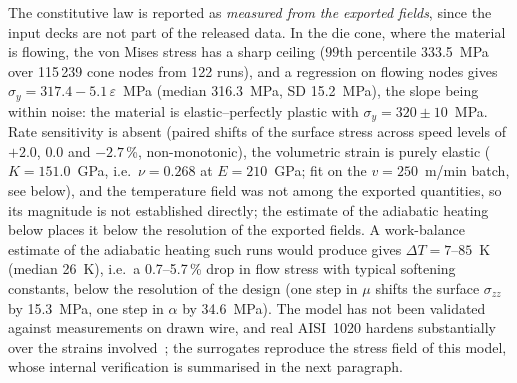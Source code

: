 The constitutive law is reported as \emph{measured from the exported fields}, since the input decks are not part of the released data. In the die cone, where the material is flowing, the von Mises stress has a sharp ceiling (99th percentile 333.5~MPa over 115\,239 cone nodes from 122 runs), %
and a regression on flowing nodes gives $\sigma_y = 317.4 - 5.1\,\varepsilon$~MPa (median 316.3~MPa, SD 15.2~MPa), the slope being within noise: %
the material is elastic--perfectly plastic with $\sigma_y = 320 \pm 10$~MPa. %
Rate sensitivity is absent (paired shifts of the surface stress across speed levels of $+2.0$, $0.0$ and $-2.7$\,\%, non-monotonic), %
the volumetric strain is purely elastic ($K = 151.0$~GPa, i.e.\ $\nu = 0.268$ at $E = 210$~GPa; fit on the $v = 250$~m/min batch, see below), and the temperature field was not among the exported quantities, so its magnitude is not established directly; the estimate of the adiabatic heating below places it below the resolution of the exported fields. %
A work-balance estimate of the adiabatic heating such runs would produce gives $\Delta T = 7$--$85$~K (median 26~K), i.e.\ a 0.7--5.7\,\% drop in flow stress with typical softening constants, below the resolution of the design (one step in $\mu$ shifts the surface $\sigma_{zz}$ by 15.3~MPa, one step in $\alpha$ by 34.6~MPa). %
The model has not been validated against measurements on drawn wire, and real AISI~1020 hardens substantially over the strains involved~\cite{TODO-aisi1020-flow-curve}; %
the surrogates reproduce the stress field of this model, whose internal verification is summarised in the next paragraph. %

